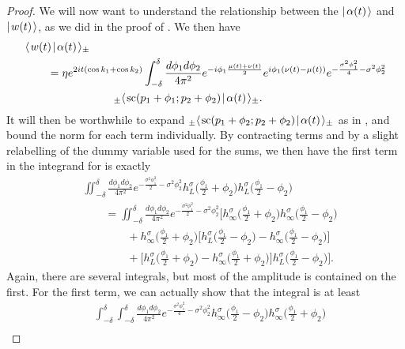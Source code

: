 \documentclass[../thesis-main/thesis-main]{subfiles}
\begin{document}
\begin{proof}

We will now want to understand the relationship between the $|\mspace{2mu} \alpha(t) \mspace{2mu} \rangle$ and $|\mspace{2mu} w(t) \mspace{2mu} \rangle$, as we did in the proof of .  We then have
\begin{align}
&\langle\mspace{2mu} w(t) \mspace{2mu} | \mspace{2mu} \alpha(t)\mspace{2mu} \rangle_{\pm} \nonumber\\
&\qquad = \eta e^{2it(\cos k_1 + \cos k_2)}\int_{-\delta}^\delta \frac{d\phi_1 d\phi_2}{4\pi^2} e^{-i \phi_1 \frac{\mu(t) + \nu(t)}{2}} e^{i \phi_1(\nu(t) - \mu(t))} e^{-\frac{\sigma^2 \phi_1^2}{4} - \sigma^2 \phi_2^2}\nonumber\\
&\qquad\qquad\qquad\qquad {}_\pm\langle\mspace{2mu} \text{sc}(p_1+\phi_1;p_2+\phi_2) \mspace{2mu} | \mspace{2mu} \alpha(t)\mspace{2mu} \rangle_\pm.\label{eq:w_alpha_ip}
\end{align}
It will then be worthwhile to expand ${}_\pm\langle\mspace{2mu} \text{sc}(p_1+\phi_2;p_2+\phi_2) \mspace{2mu} | \mspace{2mu} \alpha(t)\mspace{2mu} \rangle_\pm$ as in , and bound the norm for each term individually.   By contracting terms and by a slight relabelling of the dummy variable used for the sums, we then have the first term in the integrand for  is exactly
\begin{align}
  &\iint_{-\delta}^\delta \frac{d\phi_1 d\phi_2}{4\pi^2}e^{-\frac{\sigma^2\phi_1^2}{2} - \sigma^2 \phi_2^2} h_L^\sigma\Big(\frac{\phi_1}{2} + \phi_2\Big)h_L^\sigma\Big(\frac{\phi_1}{2} - \phi_2\Big)\\
  &\qquad = \iint_{-\delta}^\delta \frac{d\phi_1 d\phi_2}{4\pi^2}e^{-\frac{\sigma^2\phi_1^2}{2} - \sigma^2 \phi_2^2} \bigg[h_\infty^\sigma\Big(\frac{\phi_1}{2} + \phi_2\Big)h_\infty^\sigma\Big(\frac{\phi_1}{2} - \phi_2\Big)\nonumber\\
  &\qquad\qquad + h_\infty^\sigma\Big(\frac{\phi_1}{2} + \phi_2\Big)\bigg[h_L^\sigma\Big(\frac{\phi_1}{2} - \phi_2\Big) - h_\infty^\sigma\Big(\frac{\phi_1}{2} - \phi_2\Big)\bigg]\nonumber\\
  &\qquad\qquad + \bigg[h_L^\sigma\Big(\frac{\phi_1}{2} + \phi_2\Big) - h_\infty^\sigma\Big(\frac{\phi_1}{2} + \phi_2\Big)\bigg]h_L^\sigma\Big(\frac{\phi_1}{2} - \phi_2\Big)\bigg]\label{eq:w_alpha_important}.
\end{align}
Again, there are several integrals, but most of the amplitude is contained on the first.  For the first term, we can actually show that the integral is at least
\begin{align}
  &\int_{-\delta}^\delta \int_{-\delta}^{\delta} \frac{ d\phi_1 d\phi_2}{4\pi^2} e^{ - \frac{\sigma^2\phi_1^2}{4} - \sigma^2 \phi_2^2} h_\infty^\sigma \Big(\frac{\phi_1}{2} - \phi_2\Big) h_\infty^\sigma \Big( \frac{\phi_1}{2} + \phi_2\Big)\nonumber\\

\end{align}
\end{proof}
\end{document}
